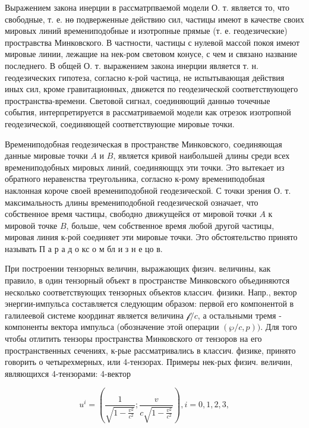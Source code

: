 \documentclass[10pt]{article}
\begin{document}
Выражением закона инерции в рассматрпваемой модели О. т. является то, что свободные, т. е. нө подверженные действию сил, частицы имеют в качестве своих мировых линий времениподобные и изотропные прямые (т. е. геодезические) простравства Минковского. В частности, частицы с нулевой массой покоя имеют мировые линии, лежащие на нек-ром световом конусе, с чем и связано название последнего. В общей О. т. выражением закона инерции является т. н. геодезических гипотеза, согласно к-рой частица, не испытывающая действия иных сил, кроме гравитационных, движется по геодезической соответствующего пространства-времени. Световой сигнал, соединяющий данныө точечные события, интерпретируется в рассматриваемой модели как отрезок изотропной геодезической, соединяющей соответствующие мировые точки.



Времениподобная геодезическая в пространстве Минковского, соединяющая данные мировые точки $A$ и $B$, является кривой наибольшей длины среди всех времениподобных мировых линий, соединяющцх эти точки. Это вытекает из обратного неравенства треугольника, согласно к-рому времениподобная наклонная короче своей времениподобной геодезической. С точки зрения О. т. максимальность длины времениподобной геодезической означает, что собственное время частицы, свободно движущейся от мировой точки $A$ к мировой точке $B$, больше, чем собственное время любой другой частицы, мировая линия к-рой соединяет эти мировые точки. Это обстоятельство принято называть П а р а д о кс о м бл и з н е цо в.



При построении тензорных величин, выражающих физич. величины, как правило, в один тензорный объект в пространстве Минковского объединяются несколько соответствующих тензорных объектов классич. физики. Напр., вектор энергии-импульса составляется следующим образом: первой его компонентой в галилеевой системе координат является величина $\mathscr{f} / c$, а остальными тремя - компоненты вектора импульса (обозначение этой операции $(\wp / c, p))$. Для того чтобы отлитить тензоры пространства Минковского от тензоров на его пространственных сечениях, к-рые рассматривались в классич. физике, принято говорить о четырехмерных, или 4-тензорах. Примеры нек-рых физич. величин, являющихся 4-тензорами: 4-вектор



\[

u^{i}=\left(\frac{1}{\sqrt{1-\frac{v^{2}}{c^{2}}}} ; \frac{v}{c \sqrt{1-\frac{v^{2}}{c^{2}}}}\right), i=0,1,2,3,

\]
\end{document}
